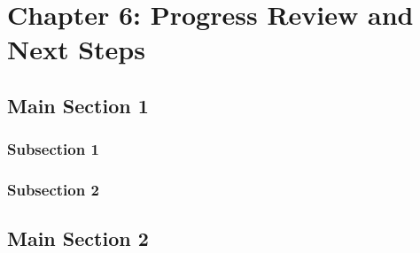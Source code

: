 \chapter{Chapter 6: Progress Review and Next Steps} 
\label{Chapter6}

\section{Main Section 1}

\subsection{Subsection 1}

\subsection{Subsection 2}


\section{Main Section 2}
